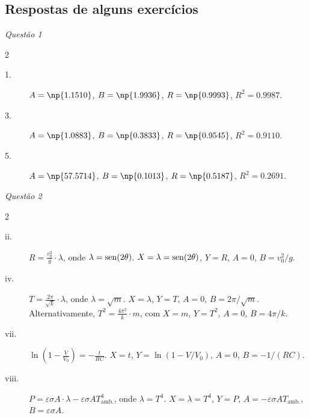 \subsection{Respostas de alguns exercícios}

\emph{Questão 1}
\begin{multicols}{2} \setlength{\columnseprule}{0.4pt}
\begin{description}
	\item[1.] $A = \np{1.1510}$, $B = \np{1.9936}$, $R = \np{0.9993}$, $R^2 = 0.9987$.
	\item[3.] $A = \np{1.0883}$, $B = \np{0.3833}$, $R = \np{0.9545}$, $R^2 = 0.9110$.
	\item[5.] $A = \np{57.5714}$, $B = \np{0.1013}$, $R = \np{0.5187}$, $R^2 = 0.2691$.
\end{description}
\end{multicols}

\emph{Questão 2}
\begin{multicols}{2} \setlength{\columnseprule}{0.4pt}
\begin{description}
	\item[ii.] $R = \frac{v_0^2}{g} \cdot \lambda$, onde $\lambda = \operatorname{sen}(2\theta)$. $X = \lambda = \operatorname{sen}(2\theta)$, $Y = R$, $A = 0$, $B = v_0^2/g$.
	\item[iv.] $T = \frac{2\pi}{\sqrt{k}} \cdot \lambda$, onde $\lambda = \sqrt{m}$. $X = \lambda$, $Y = T$, $A = 0$, $B = 2\pi/\sqrt{m}$. Alternativamente, $T^2 = \frac{4\pi^2}{k} \cdot m$, com $X = m$, $Y = T^2$, $A = 0$, $B = 4\pi/k$.
	\item[vii.] $\ln\left(1-\frac{V}{V_0}\right) = -\frac{t}{RC}$. $X = t$, $Y = \ln (1 - V/V_0)$, $A = 0$, $B = -1/(RC)$.
	\item[viii.] $P = \varepsilon\sigma A \cdot \lambda - \varepsilon\sigma A T_{\text{amb.}}^4$, onde $\lambda = T^4$. $X = \lambda = T^4$, $Y = P$, $A = - \varepsilon\sigma A T_{\text{amb.}}$, $B = \varepsilon\sigma A$.
\end{description}
\end{multicols}

